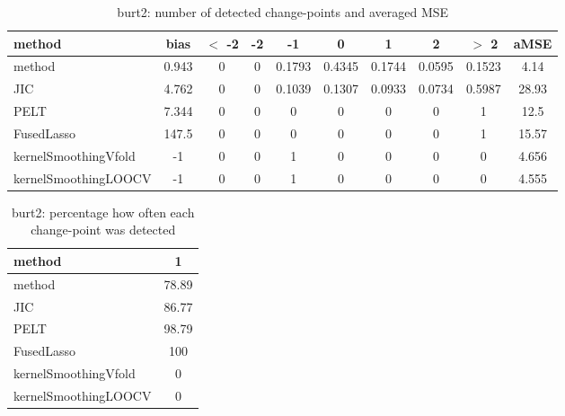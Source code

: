 \begin{table}[ht]
\centering
\begin{tabular}{l|c|ccccccc|c}
  \hline
method & bias & $<$ -2 & -2 & -1 & 0 & 1 & 2 & $>$ 2 & aMSE \\ 
  \hline
method & 0.943 &     0 &     0 & 0.1793 & 0.4345 & 0.1744 & 0.0595 & 0.1523 &  4.14 \\ 
  JIC & 4.762 &     0 &     0 & 0.1039 & 0.1307 & 0.0933 & 0.0734 & 0.5987 & 28.93 \\ 
  PELT & 7.344 &     0 &     0 &     0 &     0 &     0 &     0 &     1 &  12.5 \\ 
  FusedLasso & 147.5 &     0 &     0 &     0 &     0 &     0 &     0 &     1 & 15.57 \\ 
  kernelSmoothingVfold &    -1 &     0 &     0 &     1 &     0 &     0 &     0 &     0 & 4.656 \\ 
  kernelSmoothingLOOCV &    -1 &     0 &     0 &     1 &     0 &     0 &     0 &     0 & 4.555 \\ 
   \hline
\end{tabular}
\caption{burt2: number of detected change-points and averaged MSE} 
\label{tab:burt2Njumps}
\end{table}
\begin{table}[ht]
\centering
\begin{tabular}{l|c}
  \hline
method & 1 \\ 
  \hline
method &  78.89 \\ 
  JIC &  86.77 \\ 
  PELT &  98.79 \\ 
  FusedLasso &    100 \\ 
  kernelSmoothingVfold &      0 \\ 
  kernelSmoothingLOOCV &      0 \\ 
   \hline
\end{tabular}
\caption{burt2: percentage how often each change-point was detected} 
\label{tab:burt2Detections}
\end{table}
